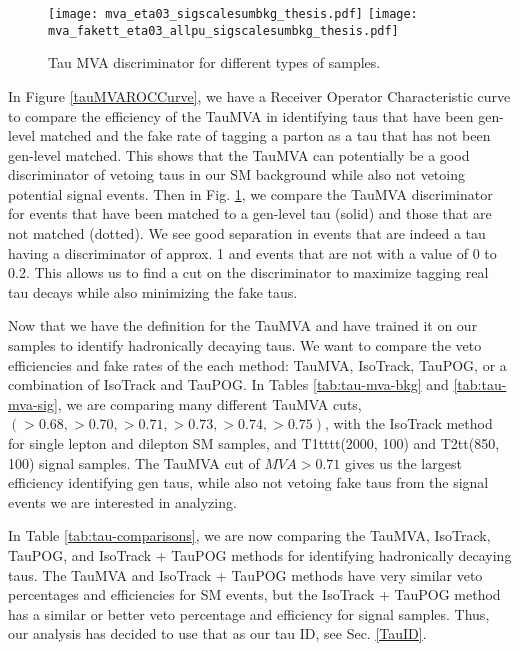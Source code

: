 \begin{figure}[!htb]
	\begin{center}
		\texttt{[image: mva\_eta03\_sigscalesumbkg\_thesis.pdf]}
		\texttt{[image: mva\_fakett\_eta03\_allpu\_sigscalesumbkg\_thesis.pdf]} \\
	\end{center}
	\caption[Tau MVA Discriminator]{Tau MVA discriminator for different types of samples.
	}
	\label{fig:tau-discriminator}
\end{figure}



In Figure \ref{tauMVAROCCurve}, we have a Receiver Operator Characteristic curve to compare the efficiency of the TauMVA in identifying taus that have been gen-level matched and the fake rate of tagging a parton as a tau that has not been gen-level matched. This shows that the TauMVA can potentially be a good discriminator of vetoing taus in our SM background while also not vetoing potential signal events. Then in Fig. \ref{fig:tau-discriminator}, we compare the TauMVA discriminator for events that have been matched to a gen-level tau (solid) and those that are not matched (dotted). We see good separation in events that are indeed a tau having a discriminator of approx. 1 and events that are not with a value of 0 to 0.2. This allows us to find a cut on the discriminator to maximize tagging real tau decays while also minimizing the fake taus.

Now that we have the definition for the TauMVA and have trained it on our samples to identify hadronically decaying taus. We want to compare the veto efficiencies and fake rates of the each method: TauMVA, IsoTrack, TauPOG, or a combination of IsoTrack and TauPOG. 
In Tables \ref{tab:tau-mva-bkg} and \ref{tab:tau-mva-sig}, we are comparing many different TauMVA cuts, $(>0.68, >0.70, >0.71, >0.73, >0.74, >0.75)$, with the IsoTrack method for \ttbar{} single lepton and dilepton SM samples, and T1tttt(2000, 100) and T2tt(850, 100) signal samples. The TauMVA cut of $MVA>0.71$ gives us the largest efficiency identifying gen taus, while also not vetoing fake taus from the signal events we are interested in analyzing.

In Table \ref{tab:tau-comparisons}, we are now comparing the TauMVA, IsoTrack, TauPOG, and IsoTrack + TauPOG methods for identifying hadronically decaying taus. The TauMVA and IsoTrack + TauPOG methods have very similar veto percentages and efficiencies for SM events, but the IsoTrack + TauPOG method has a similar or better veto percentage and efficiency for signal samples. Thus, our analysis has decided to use that as our tau ID, see Sec. \ref{TauID}.
